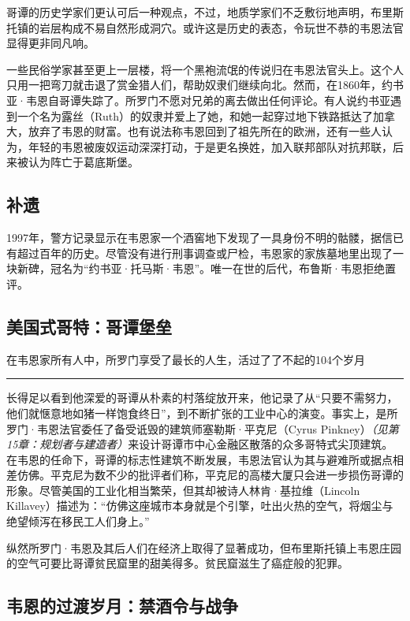 \documentclass[9pt,openany]{extbook}
\newcommand{\splitdot}{\shusong ·}
\newcommand{\chsline}{\hspace{0.15em}\rule[0.35em]{1.7em}{0.03em}\hspace{0.15em}}
\begin{document}
\begin{multicols}{2}
    哥谭的历史学家们更认可后一种观点，不过，地质学家们不乏敷衍地声明，布里斯托镇的岩层构成不易自然形成洞穴。或许这是历史的表态，令玩世不恭的韦恩法官显得更非同凡响。

    一些民俗学家甚至更上一层楼，将一个黑袍流氓的传说归在韦恩法官头上。这个人只用一把弯刀就击退了赏金猎人们，帮助奴隶们继续向北。然而，在1860年，约书亚{\splitdot}韦恩自哥谭失踪了。所罗门不愿对兄弟的离去做出任何评论。有人说约书亚遇到一个名为露丝（Ruth）的奴隶并爱上了她，和她一起穿过地下铁路抵达了加拿大，放弃了韦恩的财富。也有说法称韦恩回到了祖先所在的欧洲，还有一些人认为，年轻的韦恩被废奴运动深深打动，于是更名换姓，加入联邦部队对抗邦联，后来被认为阵亡于葛底斯堡。

    \subsection{补遗}

    1997年，警方记录显示在韦恩家一个酒窖地下发现了一具身份不明的骷髅，据信已有超过百年的历史。尽管没有进行刑事调查或尸检，韦恩家的家族墓地里出现了一块新碑，冠名为“约书亚{\splitdot}托马斯{\splitdot}韦恩”。唯一在世的后代，布鲁斯{\splitdot}韦恩拒绝置评。

    \subsection{美国式哥特：哥谭堡垒}

    在韦恩家所有人中，所罗门享受了最长的人生，活过了了不起的104个岁月{\chsline}长得足以看到他深爱的哥谭从朴素的村落绽放开来，他记录了从“只要不需努力，他们就惬意地如猪一样饱食终日”，到不断扩张的工业中心的演变。事实上，是所罗门{\splitdot}韦恩法官委任了备受诋毁的建筑师塞勒斯{\splitdot}平克尼（Cyrus Pinkney）\textit{（见第15章：规划者与建造者）}来设计哥谭市中心金融区散落的众多哥特式尖顶建筑。在韦恩的任命下，哥谭的标志性建筑不断发展，韦恩法官认为其与避难所或据点相差仿佛。平克尼为数不少的批评者们称，平克尼的高楼大厦只会进一步损伤哥谭的形象。尽管美国的工业化相当繁荣，但其却被诗人林肯{\splitdot}基拉维（Lincoln Killavey）描述为：“仿佛这座城市本身就是个引擎，吐出火热的空气，将烟尘与绝望倾泻在移民工人们身上。”

    纵然所罗门{\splitdot}韦恩及其后人们在经济上取得了显著成功，但布里斯托镇上韦恩庄园的空气可要比哥谭贫民窟里的甜美得多。贫民窟滋生了癌症般的犯罪。

    \subsection{韦恩的过渡岁月：禁酒令与战争}


\end{multicols}
\end{document}
